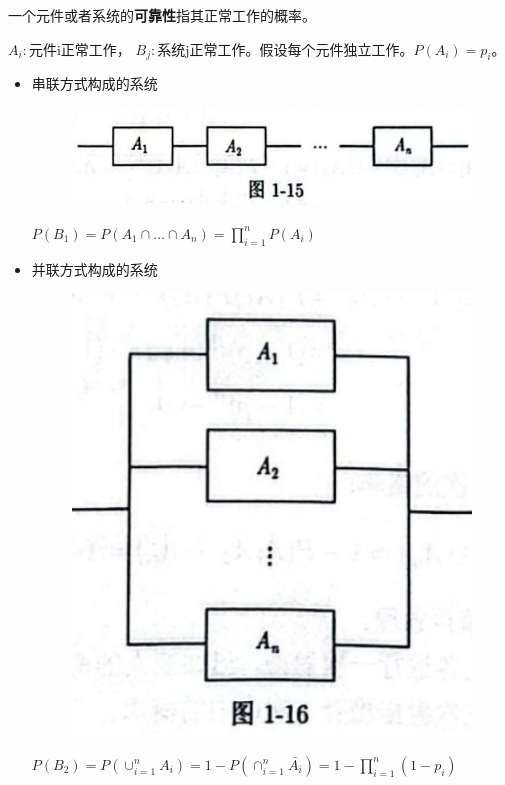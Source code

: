 \documentclass{beamer}
\begin{document}
	\begin{frame}
		一个元件或者系统的\textbf{可靠性}指其正常工作的概率。
		
		$A_i: \text{元件i正常工作}$， $B_j: \text{系统j正常工作}$。假设每个元件独立工作。$P(A_i) = p_i$。
		\begin{itemize}
			\item 串联方式构成的系统
			\begin{figure}[H]
				\centering
				\includegraphics[scale = 0.01]{figures/figure1-15}
			\end{figure}
			$P(B_1) = P(A_1 \cap \dots \cap A_n) = \prod_{i = 1}^{n}P(A_i)$
			\item 并联方式构成的系统
			\begin{figure}[H]
			\centering
			\includegraphics[scale = 0.04]{figures/figure1-16}
			\end{figure}
			$P(B_2) = P(\cup_{i = 1}^{n}A_i) = 1 - P(\cap_{i = 1}^n\bar{A_i}) = 1 - \prod_{i = 1}^{n}(1 - p_i)$
		\end{itemize}
	\end{frame}
	
\end{document}
